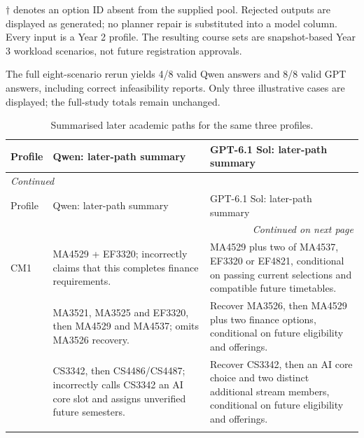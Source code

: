 \documentclass{article}
\begin{document}
\noindent\footnotesize $\dagger$ denotes an option ID absent from the supplied pool. Rejected outputs are displayed as generated; no planner repair is substituted into a model column. Every input is a Year 2 profile. The resulting course sets are snapshot-based Year 3 workload scenarios, not future registration approvals.\normalsize

The full eight-scenario rerun yields 4/8 valid Qwen answers and 8/8 valid GPT answers, including correct infeasibility reports. Only three illustrative cases are displayed; the full-study totals remain unchanged.

{\small
\setlength{\tabcolsep}{4pt}
\renewcommand{\arraystretch}{1.12}
\begin{longtable}{p{0.45in}p{2.35in}p{2.35in}}
\caption{Summarised later academic paths for the same three profiles.}\label{tab:retest-path07}\\
\toprule
Profile & Qwen: later-path summary & GPT-6.1 Sol: later-path summary\\
\midrule
\endfirsthead
\multicolumn{3}{l}{\textit{Continued}}\\
\toprule
Profile & Qwen: later-path summary & GPT-6.1 Sol: later-path summary\\
\midrule
\endhead
\midrule
\multicolumn{3}{r}{\textit{Continued on next page}}\\
\endfoot
\bottomrule
\endlastfoot
{\raggedright CM1\par} & {\raggedright MA4529 + EF3320; incorrectly claims that this completes finance requirements.\par} & {\raggedright MA4529 plus two of MA4537, EF3320 or EF4821, conditional on passing current selections and compatible future timetables.\par}\\
\addlinespace[3pt]
{\raggedright CM2\par} & {\raggedright MA3521, MA3525 and EF3320, then MA4529 and MA4537; omits MA3526 recovery.\par} & {\raggedright Recover MA3526, then MA4529 plus two finance options, conditional on future eligibility and offerings.\par}\\
\addlinespace[3pt]
{\raggedright CS2\par} & {\raggedright CS3342, then CS4486/CS4487; incorrectly calls CS3342 an AI core slot and assigns unverified future semesters.\par} & {\raggedright Recover CS3342, then an AI core choice and two distinct additional stream members, conditional on future eligibility and offerings.\par}\\
\addlinespace[3pt]
\end{longtable}
}
\end{document}
